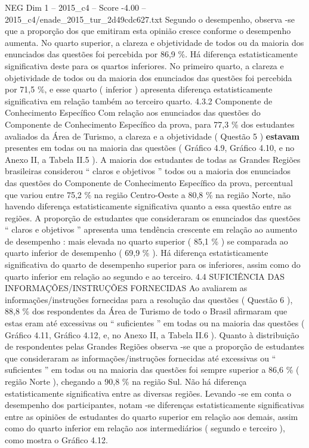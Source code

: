 \begin{textsample}{NEG Dim 1 – 2015\_c4 – Score -4.00 – 2015\_c4/enade\_2015\_tur\_2d49cdc627.txt}
Segundo o desempenho, observa -se que a proporção dos que emitiram esta opinião cresce conforme o desempenho aumenta.
No quarto superior, a clareza e objetividade de todos ou da maioria dos enunciados das questões foi percebida por 86,9 \%.
Há diferença estatisticamente significativa deste para os quartos inferiores.
No primeiro quarto, a clareza e objetividade de todos ou da maioria dos enunciados das questões foi percebida por 71,5 \%, e esse quarto ( inferior ) apresenta diferença estatisticamente significativa em relação também ao terceiro quarto. 4.3.2 Componente de Conhecimento Específico Com relação aos enunciados das questões do Componente de Conhecimento Específico da prova, para 77,3 \% dos estudantes avaliados da Área de Turismo, a clareza e a objetividade ( Questão 5 ) \textbf{estavam} presentes em todas ou na maioria das questões ( Gráfico 4.9, Gráfico 4.10, e no Anexo II, a Tabela II.5 ).
A maioria dos estudantes de todas as Grandes Regiões brasileiras considerou “ claros e objetivos ” todos ou a maioria dos enunciados das questões do Componente de Conhecimento Específico da prova, percentual que variou entre 75,2 \% na região Centro-Oeste a 80,8 \% na região Norte, não havendo diferença estatisticamente significativa quanto a essa questão entre as regiões.
A proporção de estudantes que consideraram os enunciados das questões “ claros e objetivos ” apresenta uma tendência crescente em relação ao aumento de desempenho : mais elevada no quarto superior ( 85,1 \% ) se comparada ao quarto inferior de desempenho ( 69,9 \% ).
Há diferença estatisticamente significativa do quarto de desempenho superior para os inferiores, assim como do quarto inferior em relação ao segundo e ao terceiro. 4.4 SUFICIÊNCIA DAS INFORMAÇÕES/INSTRUÇÕES FORNECIDAS Ao avaliarem as informações/instruções fornecidas para a resolução das questões ( Questão 6 ), 88,8 \% dos respondentes da Área de Turismo de todo o Brasil afirmaram que estas eram até excessivas ou “ suficientes ” em todas ou na maioria das questões ( Gráfico 4.11, Gráfico 4.12, e, no Anexo II, a Tabela II.6 ).
Quanto à distribuição de respondentes pelas Grandes Regiões observa -se que a proporção de estudantes que consideraram as informações/instruções fornecidas até excessivas ou “ suficientes ” em todas ou na maioria das questões foi sempre superior a 86,6 \% ( região Norte ), chegando a 90,8 \% na região Sul.
Não há diferença estatisticamente significativa entre as diversas regiões.
Levando -se em conta o desempenho dos participantes, notam -se diferenças estatisticamente significativas entre as opiniões de estudantes do quarto superior em relação aos demais, assim como do quarto inferior em relação aos intermediários ( segundo e terceiro ), como mostra o Gráfico 4.12.

\end{textsample}
